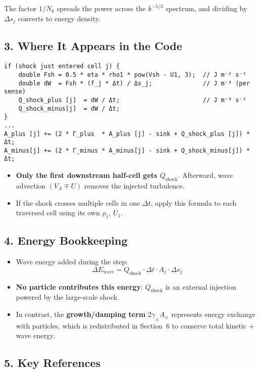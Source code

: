 \vspace{1em}
The factor $1/N_k$ spreads the power across the $k^{-5/3}$ spectrum, and dividing by $\Delta s_j$ converts to energy density.

\subsection*{3. Where It Appears in the Code}

\begin{lstlisting}
if (shock just entered cell j) {
    double Fsh = 0.5 * eta * rho1 * pow(Vsh - U1, 3);  // J m⁻² s⁻¹
    double dW  = Fsh * (f_j * Δt) / Δs_j;              // J m⁻³ (per sense)
    Q_shock_plus [j]  = dW / Δt;                       // J m⁻³ s⁻¹
    Q_shock_minus[j]  = dW / Δt;
}
...
A_plus [j] += (2 * Γ_plus  * A_plus [j] - sink + Q_shock_plus [j]) * Δt;
A_minus[j] += (2 * Γ_minus * A_minus[j] - sink + Q_shock_minus[j]) * Δt;
\end{lstlisting}

\begin{itemize}
  \item \textbf{Only the first downstream half-cell gets $Q_{\text{shock}}$}. Afterward, wave advection $(V_A \mp U)$ removes the injected turbulence.
  \item If the shock crosses multiple cells in one $\Delta t$, apply this formula to each traversed cell using its own $\rho_1$, $U_1$.
\end{itemize}

\subsection*{4. Energy Bookkeeping}

\begin{itemize}
  \item Wave energy added during the step:
  \[
  \Delta E_{\text{wave}} = Q_{\text{shock}} \cdot \Delta t \cdot A_j \cdot \Delta s_j
  \]
  \item \textbf{No particle contributes this energy}: $Q_{\text{shock}}$ is an external injection powered by the large-scale shock.
  \item In contrast, the \textbf{growth/damping term} $2\gamma_\pm A_\pm$ represents energy exchange with particles, which is redistributed in Section~6 to conserve total kinetic + wave energy.
\end{itemize}

\subsection*{5. Key References}

